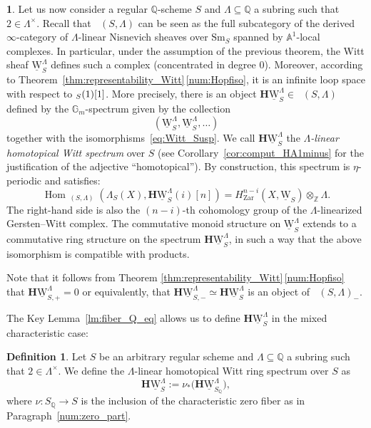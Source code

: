 \documentclass[11pt]{article}
\makeatletter
\numberwithin{equation}{section}\renewcommand{\encodingdefault}{TU}
\DeclareRobustCommand{\mathbbm}[1]{\csname jepbb@#1\endcsname}
\renewcommand{\AA}{\mathbb A}
\newcommand{\un}{\mathbbm 1}
\newcommand{\uW}{\underline{\mathrm W}}
\newcommand{\HuW}{\mathbf H \underline{\mathrm W}}
\newcommand{\eff}{\mathrm{eff}}
\newcommand{\sm}{\mathrm{Sm}}
\DeclareMathOperator{\DA}{D_{\AA^1}}
\DeclareMathOperator{\DAeff}{D_{\AA^1}^{\eff}}
\DeclareMathOperator{\Hom}{Hom}
\newcommand{\ZZ} {\mathbb Z}
\newcommand{\QQ} {\mathbb Q}
\newcommand{\GG} {\mathbb{G}_m}
\newcommand{\zar}{\mathrm{Zar}}
\theoremstyle{remark}
\theoremstyle{definition}
\newtheorem{df}[thm]{Definition}
\newtheorem{num}[thm]{}
\numberwithin{equation}{thm}
\makeatother
\begin{document}
\begin{num}\label{num:unram_Witt_spectrum}
Let us now consider a regular $\QQ$-scheme $S$ and $\Lambda \subseteq \QQ$ a subring such that $2 \in \Lambda^\times$.
Recall that $\DAeff(S,\Lambda)$ can be seen as the full subcategory
of the derived $\infty$\nobreakdash-cat\-egory of $\Lambda$-linear Nisnevich sheaves over $\sm_S$ spanned by $\AA^1$-local complexes.
In particular, under the assumption of the previous theorem,
the Witt sheaf $\uW^\Lambda_S$ defines such a complex
(concentrated in degree $0$). Moreover,
according to Theorem~\ref{thm:representability_Witt}\,\eqref{num:Hopfiso}, it is an infinite loop space with respect to $\un_S(1)[1]$.
More precisely, there is an object $\HuW^\Lambda_S \in \DA(S,\Lambda)$ defined by the $\GG$-spectrum given by the collection
\[
(\uW^\Lambda_S,\uW^\Lambda_S,\hdots)
\]
together with the isomorphisms~\eqref{eq:Witt_Susp}.
We call $\HuW^\Lambda_S$ the \emph{$\Lambda$-linear homotopical Witt spectrum} over $S$ (see Corollary~\ref{cor:comput_HA1minus} for the justification of the adjective ``homotopical'').
By construction, this spectrum is $\eta$-periodic and satisfies:
\[
\Hom_{\DA(S,\Lambda)}(\Lambda_S(X),\HuW^\Lambda_S(i)[n])=H^{n-i}_\zar(X,\uW_S) \otimes_\ZZ \Lambda.
\]
The right-hand side is also the $(n-i)$-th cohomology group of the $\Lambda$-linearized Gersten--Witt complex.
The commutative monoid structure on $\uW^\Lambda_S$ extends
to a commutative ring structure on the spectrum $\HuW^\Lambda_S$,
in such a way that the above isomorphism is compatible with products.

Note that it follows from Theorem \ref{thm:representability_Witt}\,\eqref{num:Hopfiso}
that $\HuW^\Lambda_{S,+}=0$ or equivalently, that $\HuW^\Lambda_{S,-}\simeq\HuW^\Lambda_S$
is an object of $\DA(S,\Lambda)_-$.
\end{num}

The Key Lemma~\ref{lm:fiber_Q_eq} allows us to define $\HuW^\Lambda_S$ in the mixed characteristic case:
\begin{df}\label{df:HW}
Let $S$ be an arbitrary regular scheme and $\Lambda \subseteq \QQ$
a subring such that $2 \in \Lambda^\times$.
We define the $\Lambda$-linear homotopical Witt ring spectrum
over $S$ as
\[
\HuW^\Lambda_S := \nu_*\big(\HuW^\Lambda_{S_\QQ}\big),
\]
where $\nu:S_\QQ \to S$ is the inclusion of the characteristic zero fiber as in Paragraph~\ref{num:zero_part}.
\end{df}
\end{document}
